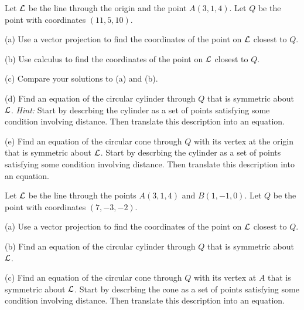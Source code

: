 \documentclass{ximera}
\begin{document}
\begin{question}  \label{Qfgsadge:Scalar}
Let ${\cal L}$ be the line through the origin and the point $A(3,1,4)$. Let $Q$ be the point with coordinates $(11,5,10)$.

(a) Use a vector projection to find the coordinates of the point on ${\cal L}$ closest to $Q$.

(b) Use calculus to find the coordinates of the point on ${\cal L}$ closest to $Q$.

(c) Compare your solutions to (a) and (b).

(d) Find an equation of the circular cylinder through $Q$ that is symmetric about ${\cal L}$. {\it Hint:} Start by descrbing the cylinder as a set of points satisfying some condition involving distance. Then translate this description into an equation.

(e) Find an equation of the circular cone through $Q$ with its vertex at the origin that is symmetric about ${\cal L}$. Start by descrbing the cylinder as a set of points satisfying some condition involving distance. Then translate this description into an equation.
\end{question}


\begin{question}  \label{Qfgs643r6e:Scalar}
Let ${\cal L}$ be the line through the points $A(3,1,4)$ and $B(1,-1,0)$. Let $Q$ be the point with coordinates $(7,-3,-2)$.

(a) Use a vector projection to find the coordinates of the point on ${\cal L}$ closest to $Q$.

(b) Find an equation of the circular cylinder through $Q$ that is symmetric about ${\cal L}$. 

(c) Find an equation of the circular cone through $Q$ with its vertex at $A$ that is symmetric about ${\cal L}$. Start by descrbing the cone as a set of points satisfying some condition involving distance. Then translate this description into an equation.
\end{question}
\end{document}
